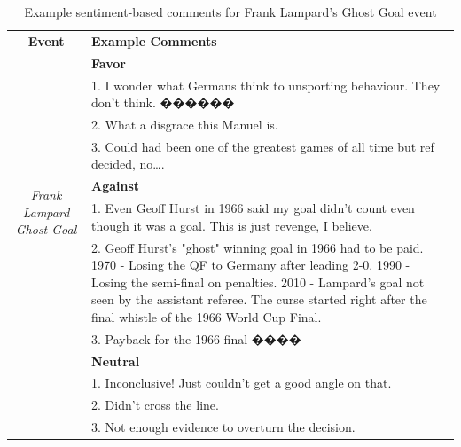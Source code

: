 \documentclass[sigconf, review]{acmart}
\begin{document}
\begin{table}[htbp]
    \centering
    \begin{tabular}{|c|p{12cm}|}
        \hline
        \textbf{Event} & \textbf{Example Comments} \\
        \multirow{9}{*}{\textit{Frank Lampard Ghost Goal}} 
         & \textbf{Favor} \\
         & 1. I wonder what Germans think to unsporting behaviour. They don't think. ������ \\
         & 2. What a disgrace this Manuel is. \\
         & 3. Could had been one of the greatest games of all time but ref decided, no…. \\
         \hline
         & \textbf{Against} \\
         & 1. Even Geoff Hurst in 1966 said my goal didn’t count even though it was a goal. This is just revenge, I believe. \\
         & 2. Geoff Hurst's "ghost" winning goal in 1966 had to be paid.  
           1970 - Losing the QF to Germany after leading 2-0.  
           1990 - Losing the semi-final on penalties.  
           2010 - Lampard’s goal not seen by the assistant referee.  
           The curse started right after the final whistle of the 1966 World Cup Final. \\
         & 3. Payback for the 1966 final ���� \\
         \hline
         & \textbf{Neutral} \\
         & 1. Inconclusive! Just couldn’t get a good angle on that. \\
         & 2. Didn’t cross the line. \\
         & 3. Not enough evidence to overturn the decision. \\
        \hline
    \end{tabular}
    \caption{Example sentiment-based comments for Frank Lampard's Ghost Goal event}
    \label{tab:frank_lampard_comments}
\end{table}
\end{document}
